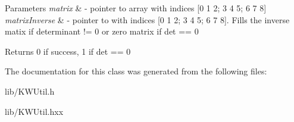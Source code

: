 \begin{DoxyParams}{Parameters}
{\em matrix} & -\/ pointer to array with indices \mbox{[}0 1 2; 3 4 5; 6 7 8\mbox{]} \\
\hline
{\em matrix\-Inverse} & -\/ pointer to with indices \mbox{[}0 1 2; 3 4 5; 6 7 8\mbox{]}. Fills the inverse matix if determinant != 0 or zero matrix if det == 0 \\
\hline
\end{DoxyParams}
\begin{DoxyReturn}{Returns}
0 if success, 1 if det == 0 
\end{DoxyReturn}


The documentation for this class was generated from the following files\-:\begin{DoxyCompactItemize}
\item 
lib/K\-W\-Util.\-h\item 
lib/K\-W\-Util.\-hxx\end{DoxyCompactItemize}
